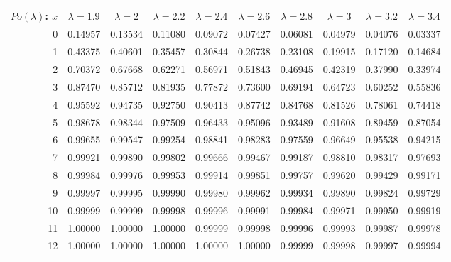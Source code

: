 \vspace{8pt minus 6pt}
\begin{tabular}{|r|c|c|c|c|c|c|c|c|c|}
\hline
$Po(\lambda)$: $x$
   & $\lambda=1.9$ & $\lambda=2$ & $\lambda=2.2$ & $\lambda=2.4$ & $\lambda=2.6$ & $\lambda=2.8$ & $\lambda=3$ & $\lambda=3.2$ & $\lambda=3.4$ \\\hline
  0&0.14957&0.13534&0.11080&0.09072&0.07427&0.06081&0.04979&0.04076&0.03337\\
  1&0.43375&0.40601&0.35457&0.30844&0.26738&0.23108&0.19915&0.17120&0.14684\\
  2&0.70372&0.67668&0.62271&0.56971&0.51843&0.46945&0.42319&0.37990&0.33974\\
  3&0.87470&0.85712&0.81935&0.77872&0.73600&0.69194&0.64723&0.60252&0.55836\\
  4&0.95592&0.94735&0.92750&0.90413&0.87742&0.84768&0.81526&0.78061&0.74418\\
  5&0.98678&0.98344&0.97509&0.96433&0.95096&0.93489&0.91608&0.89459&0.87054\\
  6&0.99655&0.99547&0.99254&0.98841&0.98283&0.97559&0.96649&0.95538&0.94215\\
  7&0.99921&0.99890&0.99802&0.99666&0.99467&0.99187&0.98810&0.98317&0.97693\\
  8&0.99984&0.99976&0.99953&0.99914&0.99851&0.99757&0.99620&0.99429&0.99171\\
  9&0.99997&0.99995&0.99990&0.99980&0.99962&0.99934&0.99890&0.99824&0.99729\\
 10&0.99999&0.99999&0.99998&0.99996&0.99991&0.99984&0.99971&0.99950&0.99919\\
 11&1.00000&1.00000&1.00000&0.99999&0.99998&0.99996&0.99993&0.99987&0.99978\\
 12&1.00000&1.00000&1.00000&1.00000&1.00000&0.99999&0.99998&0.99997&0.99994\\
\hline
\end{tabular}

